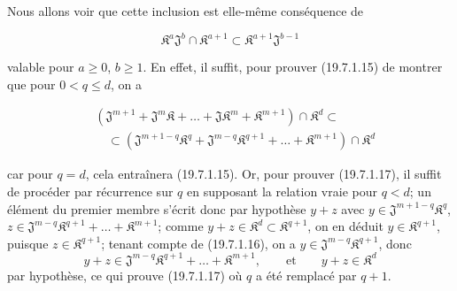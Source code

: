 Nous allons voir que cette inclusion est elle-même conséquence de
\begin{env}[19.7.1.16]
\label{IV.19.7.1.16}
\[
  \mathfrak K^a\mathfrak J^b\cap\mathfrak K^{a+1}\subset\mathfrak K^{a+1}\mathfrak J^{b-1}
\]
\end{env}
valable pour $a\geq0$, $b\geq1$. En effet, il suffit, pour prouver (19.7.1.15) de montrer que pour $0<q\leq d$, on a
\begin{env}[19.7.1.17]
\label{IV.19.7.1.17}
\[
\begin{aligned}
  &(\mathfrak J^{m+1}+\mathfrak J^m\mathfrak K+\ldots+\mathfrak J\mathfrak K^m+\mathfrak K^{m+1})\cap\mathfrak K^d\subset\\
  &\quad\subset(\mathfrak J^{m+1-q}\mathfrak K^q+\mathfrak J^{m-q}\mathfrak K^{q+1}+\ldots+\mathfrak K^{m+1})\cap\mathfrak K^d
\end{aligned}
\]
\end{env}
car pour $q=d$, cela entraînera (19.7.1.15). Or, pour prouver (19.7.1.17), il suffit de procéder par récurrence sur $q$ en supposant la relation vraie pour $q<d$; un élément du premier membre s'écrit donc par hypothèse $y+z$ avec $y\in\mathfrak J^{m+1-q}\mathfrak K^q$, $z\in\mathfrak J^{m-q}\mathfrak K^{q+1}+\ldots+\mathfrak K^{m+1}$; comme $y+z\in\mathfrak K^d\subset\mathfrak K^{q+1}$, on en déduit $y\in\mathfrak K^{q+1}$, puisque $z\in\mathfrak K^{q+1}$; tenant compte de (19.7.1.16), on a $y\in\mathfrak J^{m-q}\mathfrak K^{q+1}$, donc
\[
  y+z\in\mathfrak J^{m-q}\mathfrak K^{q+1}+\ldots+\mathfrak K^{m+1},\qquad\text{et}\qquad y+z\in\mathfrak K^d
\]
par hypothèse, ce qui prouve (19.7.1.17) où $q$ a été remplacé par $q+1$.

